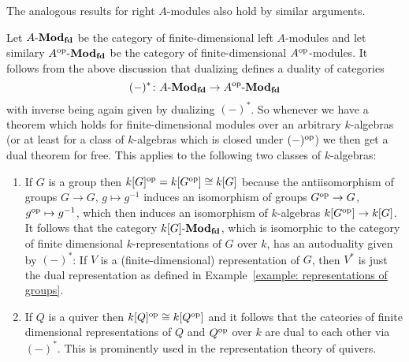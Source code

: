 \begin{example}
  The analogous results for right $A$-modules also hold by similar arguments.

  Let $A\text{-}\mathbf{Mod}_{\mathbf{fd}}$ be the category of finite-dimensional left $A$-modules and let similary $A^{\operatorname{op}}\text{-}\mathbf{Mod}_{\mathbf{fd}}$ be the category of finite-dimensional $A^{\operatorname{op}}$-modules.
  It follows from the above discussion that dualizing defines a duality of categories
  \[
            (-)^*
    \colon  A\text{-}\mathbf{Mod}_{\mathbf{fd}}
    \to     A^{\operatorname{op}}\text{-}\mathbf{Mod}_{\mathbf{fd}}
  \]
  with inverse being again given by dualizing $(-)^*$.
  So whenever we have a theorem which holds for finite-dimensional modules over an arbitrary $k$-algebras (or at least for a class of $k$-algebras which is closed under $(-)^{\operatorname{op}}$) we then get a dual theorem for free.
  This applies to the following two classes of $k$-algebras:
  \begin{enumerate}
    \item
      If $G$ is a group then $k[G]^{\operatorname{op}} = k[G^{\operatorname{op}}] \cong k[G]$ because the antiisomorphism of groups $G \to G$, $g \mapsto g^{-1}$ induces an isomorphism of groups $G^{\operatorname{op}} \to G$, $g^{\operatorname{op}} \mapsto g^{-1}$, which then induces an isomorphism of $k$-algebras $k[G^{\operatorname{op}}] \to k[G]$.
      It follows that the category $k[G]\text{-}\mathbf{Mod}_{\mathbf{fd}}$, which is isomorphic to the category of finite dimensional $k$-representations of $G$ over $k$, has an autoduality given by $(-)^*$:
      If $V$ is a (finite-dimensional) representation of $G$, then $V^*$ is just the dual representation as defined in Example~\ref{example: representations of groups}.
    \item
      If $Q$ is a quiver then $k[Q]^{\operatorname{op}} \cong k[Q^{\operatorname{op}}]$ and it follows that the cateories of finite dimensional representations of $Q$ and $Q^{\operatorname{op}}$ over $k$ are dual to each other via $(-)^*$.
      This is prominently used in the representation theory of quivers.
  \end{enumerate}
\end{example}




